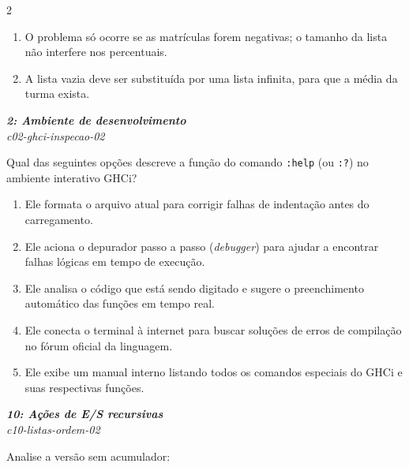\documentclass[a4paper,10pt,brazil]{article}
\begin{document}
\begin{multicols}{2}
\begin{enumerate}
  \item O problema só ocorre se as matrículas forem negativas; o tamanho da lista não interfere nos percentuais.

  \item A lista vazia deve ser substituída por uma lista infinita, para que a média da turma exista.


\end{enumerate}

\begin{flushright}
  \footnotesize
  \textit{\textbf{2: Ambiente de desenvolvimento}}\\
  \textit{c02-ghci-inspecao-02}\\

\end{flushright}
Qual das seguintes opções descreve a função do comando \texttt{:help} (ou \texttt{:?}) no ambiente interativo GHCi?

\begin{enumerate}
  \item Ele formata o arquivo atual para corrigir falhas de indentação antes do carregamento.

  \item Ele aciona o depurador passo a passo (\emph{debugger}) para ajudar a encontrar falhas lógicas em tempo de execução.

  \item Ele analisa o código que está sendo digitado e sugere o preenchimento automático das funções em tempo real.

  \item Ele conecta o terminal à internet para buscar soluções de erros de compilação no fórum oficial da linguagem.

  \item Ele exibe um manual interno listando todos os comandos especiais do GHCi e suas respectivas funções.


\end{enumerate}

\begin{flushright}
  \footnotesize
  \textit{\textbf{10: Ações de E/S recursivas}}\\
  \textit{c10-listas-ordem-02}\\

\end{flushright}
Analise a versão sem acumulador:


\end{multicols}
\end{document}
